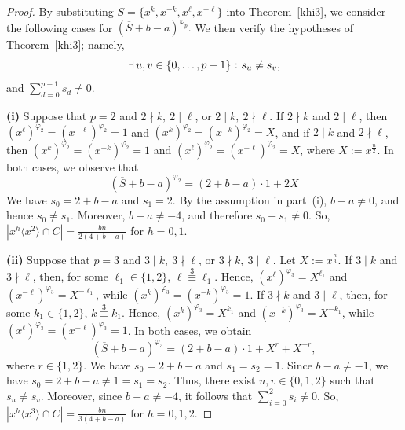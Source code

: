 \documentclass[12pt]{article}
\begin{document}
\begin{proof}
By substituting
$
S=\{x^k,x^{-k},x^\ell,x^{-\ell}\}
$
into Theorem~\ref{khi3}, we consider the following cases for
$
(\overline{S}+b-a)^{\varphi_p}.
$ We then verify the hypotheses of Theorem~\ref{khi3}; namely,
	\begin{equation}\label{eq:susv}
    \exists\,u,v\in\{0,\ldots,p-1\}\ \text : \ s_u \neq s_v, \end{equation}
and $\sum_{d=0}^{p-1}s_d\neq0.$	
	
\indent\textbf{(i)} Suppose that \(p=2\) and \(2\nmid k,\ 2\mid \ell\), or \(2\mid k,\ 2\nmid \ell\). If \(2\nmid k\) and \(2\mid \ell\), then \((x^\ell)^{\varphi_2}=(x^{-\ell})^{\varphi_2}=1\) and \((x^k)^{\varphi_2}=(x^{-k})^{\varphi_2}=X\), and if \(2\mid k\) and \(2\nmid \ell\), then \((x^k)^{\varphi_2}=(x^{-k})^{\varphi_2}=1\) and \((x^\ell)^{\varphi_2}=(x^{-\ell})^{\varphi_2}=X\), where \(X:=x^{\frac{n}{2}}\). In both cases, we observe that
\[
(\overline{S}+b-a)^{\varphi_2}
=
(2+b-a)\cdot 1+2X
\]
We have
$s_0=2+b-a$ and $s_1=2.$
By the assumption in part~(i), \(b-a\neq 0\), and hence
$s_0\neq s_1.$
Moreover, \(b-a\neq -4\), and therefore $s_0+s_1\neq 0.$ So,
$
\left|x^h\langle x^2\rangle\cap C\right|
=
\frac{bn}{2(4+b-a)}$ for $h=0,1.$

\indent\textbf{(ii)} Suppose that \(p=3\) and \(3\mid k,\ 3\nmid \ell\), or \(3\nmid k,\ 3\mid \ell\). Let \(X:=x^{\frac{n}{3}}\). If \(3\mid k\) and \(3\nmid \ell\), then, for some \(\ell_1\in\{1,2\}\), \(\ell\stackrel{3}{\equiv}\ell_1\). Hence, \((x^\ell)^{\varphi_3}=X^{\ell_1}\) and \((x^{-\ell})^{\varphi_3}=X^{-\ell_1}\), while \((x^k)^{\varphi_3}=(x^{-k})^{\varphi_3}=1\). If \(3\nmid k\) and \(3\mid \ell\), then, for some \(k_1\in\{1,2\}\), \(k\stackrel{3}{\equiv}k_1\). Hence, \((x^k)^{\varphi_3}=X^{k_1}\) and \((x^{-k})^{\varphi_3}=X^{-k_1}\), while \((x^\ell)^{\varphi_3}=(x^{-\ell})^{\varphi_3}=1\). In both cases, we obtain
\[
(\overline{S}+b-a)^{\varphi_3}
=(2+b-a)\cdot1+X^r+X^{-r},
\]
where \(r\in\{1,2\}\). We have
$s_0=2+b-a$ and $s_1=s_2=1.$ Since \(b-a\neq -1\), we have \(s_0=2+b-a\neq1=s_1=s_2\). Thus, there exist \(u,v\in\{0,1,2\}\) such that \(s_u\neq s_v\). Moreover, since \(b-a\neq -4\), it follows that \(\sum_{i=0}^{2}s_i\neq 0\).
So, $
\left|x^h\langle x^3\rangle\cap C\right|
=
\frac{bn}{3(4+b-a)}$ for $h=0,1,2.$   	
	

\end{proof}
\end{document}
